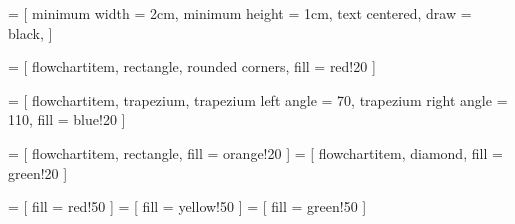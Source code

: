 \usepackage{tikz}
\usepackage{tkz-euclide}
\usetikzlibrary{shapes.geometric, arrows}
\usepackage{tikz-qtree}


 = [
	minimum width = 2cm,
	minimum height = 1cm,
	text centered,
	draw = black,
]

 = [
	flowchartitem,
	rectangle,
	rounded corners,
	fill = red!20
]
 
 = [
	flowchartitem,
	trapezium,
	trapezium left angle = 70,
	trapezium right angle = 110,
	fill = blue!20
]

 = [
	flowchartitem,
	rectangle,
	fill = orange!20
]
 = [
	flowchartitem,
	diamond,
	fill = green!20
]

 = [ fill = red!50 ]
 = [ fill = yellow!50 ]
 = [ fill = green!50 ]

\newenvironment*{tikzfigure}[1][]{
	\begin{figure}[h!]
	\begin{tikzfigureinternal}[#1]
}{
	\end{tikzfigureinternal}
	\end{figure}
}

\newenvironment*{tikzsubfigure}[1][]{
	\begin{subfigure}[b]{0.45\textwidth}
	\begin{tikzfigureinternal}[#1]
}{
	\end{tikzfigureinternal}
	\end{subfigure}
}

\newenvironment*{tikzfigureinternal}[1][]{
	\centering
	\gdef\tcapt{#1}
	\begin{tikzpicture}[scale=1]
}{
	\end{tikzpicture}
	\caption{\tcapt}
}

\newenvironment*{flowchart}[2]{
	\label{#1}
	\begin{tikzfigure}[#2]
	\tikzset {
		level distance = 3cm,
		grow = down,
		edge from parent/.append style = {
			thick, -> , >=stealth,
			decoration = {
				markings,
				mark = at position 1 with {
					\arrow[scale=2]{>}
				}
			},
			postaction = {decorate}
		}
	}
}{
	\end{tikzfigure}
}
